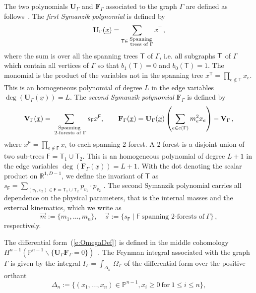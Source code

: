 \documentclass[a4paper,12pt]{article}
\numberwithin{equation}{section}
\numberwithin{figure}{section}
\begin{document}
The two polynomials $\textbf{U}_\Gamma$ and $\textbf{F}_\Gamma$
associated to the graph $\Gamma$ are defined as
follows~\cite{nakanishi1971graph,Bogner:2010kv,Weinzierl:2022eaz}.  The {\em first
Symanzik polynomial} is defined by
\begin{equation}\label{e:Udef}
{\bf U}_\Gamma (\underline x)= \sum_{\mathsf{T} \in \substack{ \text{Spanning} \\ \text{ trees of } \Gamma}} x^{\mathsf{T}}\,, 
\end{equation}
where the sum is over all the spanning trees $\mathsf{T}$ of $\Gamma$,  i.e.  all subgraphs ${\sf T}$ of $\Gamma$ which contain all
vertices of $\Gamma$ so that $b_1(\mathsf{T}) =0$ and
$b_0(\mathsf{T})=1$. The
monomial is the product of the variables not in the spanning tree
$x^{\mathsf{T}} = \prod_{e\notin {\mathsf{T}}} x_e$.  This is an
homogeneous polynomial of degree $L$ in the edge variables $\deg(\textbf{U}_\Gamma(\underline x))=L$.
The {\em second 
Symanzik polynomial}  $\textbf{F}_\Gamma$ is defined by
\begin{equation}\label{e:VFdef}
{\bf V}_{\Gamma} (\underline x)= \sum_{\substack{ \text{Spanning} \\ \text{ 2-forests
			of } \Gamma}}s_{\mathsf{F}} x^{\mathsf{F}}
                  ,\qquad {\bf F}_{\Gamma}(\underline x) = {\bf
                    U}_\Gamma(\underline x)\left( \sum_{e \in e(\Gamma)} m_e^2 x_e\right) - {\bf V}_{\Gamma}\,,
\end{equation}
where $x^{\mathsf{F}} =
\prod_{e \notin \mathsf{F}} x_i$ to each spanning 2-forest. A 2-forest
is a disjoint union of two sub-trees $\mathsf{F}=\mathsf{T}_1\cup \mathsf{T}_2$. 
 This is an
homogeneous polynomial of degree $L+1$ in the edge variables
$\deg(\textbf{F}_\Gamma(\underline x))=L+1$.
With the dot denoting the scalar product on $\mathbb R^{1,D-1}$,  we define the invariant of $\mathsf T$ as $s_\mathsf{F} = \sum_{(v_1,v_2) \in \mathsf{F}=\mathsf{T}_1\cup \mathsf{T}_2} p_{v_1}\cdot p_{v_2}$ .
The second Symanzik polynomial carries all dependence on the physical parameters, that is 
the
internal masses and the external kinematics, which we  write as 
\begin{equation}
\vec m:=\{m_1,\dots,m_n\}, \quad  \vec s:=\{s_\textsf{F} \mid \textsf{F} ~ \textrm{spanning
	2-forests of}~\Gamma\}\, ,	
\end{equation}
respectively.



The differential form~(\ref{e:OmegaDef}) is defined in the middle cohomology $H^{n-1}(\mathbb P^{n-1}\backslash
\{\textbf{U}_\Gamma \textbf{F}_\Gamma=0\})$~\cite{bek,Brown:2009ta}.
The Feynman integral associated with the graph $\Gamma$ is 
given by the integral $  I_\Gamma = \int_{\Delta_n}
\, \Omega_\Gamma$ of the  differential form over
 the positive orthant
\begin{equation}\label{e:Deltan}
	\Delta_n:=\{(x_1,\dots,x_n)\in \mathbb P^{n-1}, x_i \geq0 ~\textrm{for}~ 1\leq
	i\leq n\},
\end{equation}
\end{document}
